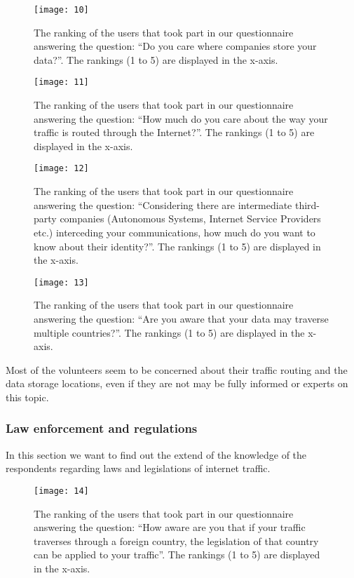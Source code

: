 \begin{figure}[H]
\centering
\texttt{[image: 10]}
\caption{The ranking of the users that took part in our questionnaire answering
the question: ``Do you care where companies store your data?''. The rankings (1 
to 5) are displayed in the x-axis.}
\end{figure}

\begin{figure}[H]
\centering
\texttt{[image: 11]}
\caption{The ranking of the users that took part in our questionnaire answering
the question: ``How much do you care about the way your traffic is routed 
through the Internet?''. The rankings (1 to 5) are displayed in the x-axis.}
\end{figure}

\begin{figure}[H]
\centering
\texttt{[image: 12]}
\caption{The ranking of the users that took part in our questionnaire answering
the question: ``Considering there are intermediate third-party companies 
(Autonomous Systems, Internet Service Providers etc.) interceding your 
communications, how much do you want to know about their identity?''. The 
rankings (1 to 5) are displayed in the x-axis.}
\end{figure}

\begin{figure}[H]
\centering
\texttt{[image: 13]}
\caption{The ranking of the users that took part in our questionnaire answering
the question: ``Are you aware that your data may traverse multiple countries?''. The
rankings (1 to 5) are displayed in the x-axis.}
\end{figure}

Most of the volunteers  seem to be concerned about their traffic routing and the 
data  storage locations, even if they are not may be fully informed or experts 
on this topic. 

\subsubsection{Law enforcement and regulations}

In this section we want to find out the extend of the knowledge of the 
respondents regarding laws and legislations of internet traffic.

\begin{figure}[H]
\centering
\texttt{[image: 14]}
\caption{The ranking of the users that took part in our questionnaire answering
the question: ``How aware are you that if your traffic traverses through a 
foreign country, the legislation of that country can be applied to your 
traffic''. The rankings (1 to 5) are displayed in the x-axis.}
\end{figure}


